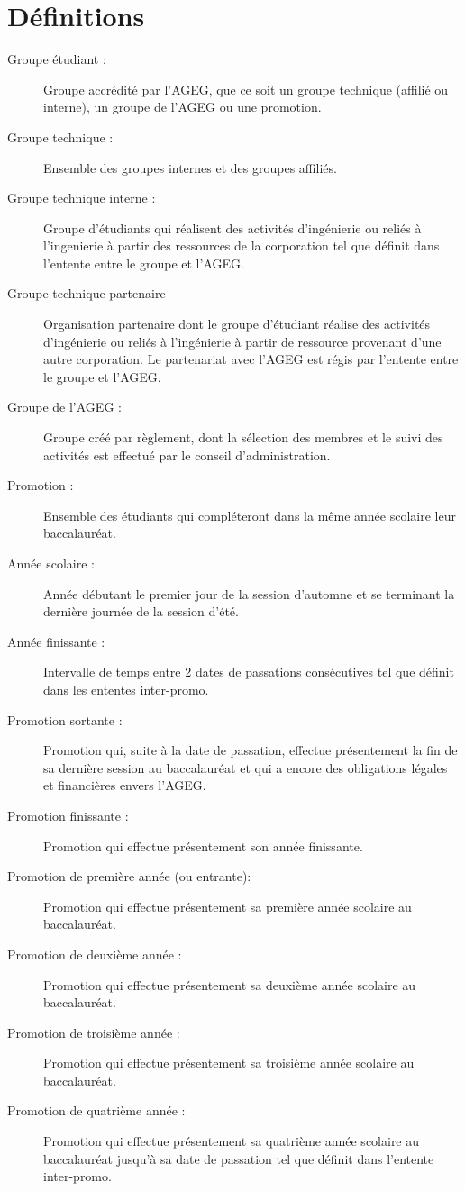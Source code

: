 \chapter*{Définitions}
\begin{description}
\item[Groupe étudiant :]{Groupe accrédité par l'AGEG, que ce soit un groupe technique (affilié ou interne), un groupe de l'AGEG ou une promotion.}
\item[Groupe technique :]{Ensemble des groupes internes et des groupes affiliés.}
\item[Groupe technique interne :]{Groupe d'étudiants qui réalisent des activités d'ingénierie ou reliés à l'ingenierie à partir des ressources de la corporation tel que définit dans l'entente entre le groupe et l'AGEG.}
\item[Groupe technique partenaire]{Organisation  partenaire dont  le  groupe  d’étudiant  réalise  des  activités  d’ingénierie  ou  reliés  à l’ingénierie  à  partir  de  ressource  provenant  d’une  autre  corporation. Le partenariat  avec  l’AGEG  est  régis  par  l’entente  entre  le  groupe  et l’AGEG.}
\item[Groupe de l’AGEG :]{Groupe créé par règlement, dont la sélection des membres et le suivi des activités est effectué par le conseil d'administration.}

\end{description}
\vspace{5mm}
\begin{description}
\item[Promotion :]{Ensemble des étudiants qui compléteront dans la même année scolaire leur baccalauréat.}
\item[Année scolaire :]{Année débutant le premier jour de la session d'automne et se terminant la dernière journée de la session d'été.}
\item[Année finissante :]{Intervalle de temps entre 2 dates de passations consécutives tel que définit dans les ententes inter-promo.}
\item[Promotion sortante :]{Promotion qui, suite à la date de passation, effectue présentement la fin de sa dernière session au baccalauréat et qui a encore des obligations légales et financières envers l’AGEG.}
\item[Promotion finissante :]{Promotion qui effectue présentement son année finissante.}
\item[Promotion  de première année (ou entrante):]{Promotion qui effectue présentement sa première année scolaire au baccalauréat.}
\item[Promotion de deuxième année :]{Promotion qui effectue présentement sa deuxième année scolaire au baccalauréat.}
\item[Promotion de troisième année :]{Promotion qui effectue présentement sa troisième année scolaire au baccalauréat.}
\item[Promotion de quatrième année :]{Promotion qui effectue présentement sa quatrième année scolaire au baccalauréat jusqu'à sa date de passation tel que définit dans l'entente inter-promo.}
\end{description}
